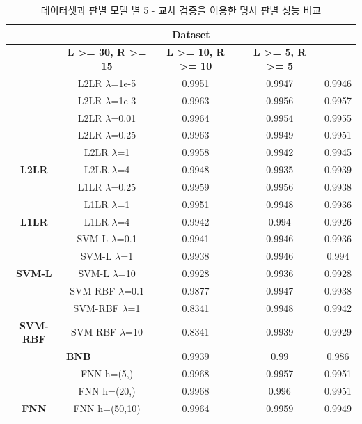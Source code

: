 \documentclass[11pt]{article}
\begin{document}
\begin{table}[ht]
\small
\centering
\caption{데이터셋과 판별 모델 별 5 - 교차 검증을 이용한 명사 판별 성능 비교}
\label{tab:classifier_comparison}
\begin{tabular}{|c|c|c|c|c|}
\hline
\rowcolor[HTML]{EFEFEF} 
\multicolumn{2}{|c|}{\cellcolor[HTML]{EFEFEF}\textbf{}} & \multicolumn{3}{c|}{\cellcolor[HTML]{EFEFEF}\textbf{Dataset}} \\ \hline
\rowcolor[HTML]{EFEFEF} 
\multicolumn{2}{|c|}{\cellcolor[HTML]{EFEFEF}\textbf{Algorithm}} & \textbf{L \textgreater= 30, R \textgreater= 15} & \textbf{L \textgreater= 10, R \textgreater= 10} & \textbf{L \textgreater= 5, R \textgreater= 5} \\ \hline
 & L2LR $\lambda$=1e-5 & 0.9951 & 0.9947 & 0.9946 \\ \cline{2-5} 
 & L2LR $\lambda$=1e-3 & 0.9963 & 0.9956 & 0.9957 \\ \cline{2-5} 
 & L2LR $\lambda$=0.01 & 0.9964 & 0.9954 & 0.9955 \\ \cline{2-5} 
 & L2LR $\lambda$=0.25 & 0.9963 & 0.9949 & 0.9951 \\ \cline{2-5} 
 & L2LR $\lambda$=1 & 0.9958 & 0.9942 & 0.9945 \\ \cline{2-5} 
\multirow{-6}{*}{\textbf{L2LR}} & L2LR $\lambda$=4 & 0.9948 & 0.9935 & 0.9939 \\ \hline
 & L1LR $\lambda$=0.25 & 0.9959 & 0.9956 & 0.9938 \\ \cline{2-5} 
 & L1LR $\lambda$=1 & 0.9951 & 0.9948 & 0.9936 \\ \cline{2-5} 
\multirow{-3}{*}{\textbf{L1LR}} & L1LR $\lambda$=4 & 0.9942 & 0.994 & 0.9926 \\ \hline
 & SVM-L $\lambda$=0.1 & 0.9941 & 0.9946 & 0.9936 \\ \cline{2-5} 
 & SVM-L $\lambda$=1 & 0.9938 & 0.9946 & 0.994 \\ \cline{2-5} 
\multirow{-3}{*}{\textbf{SVM-L}} & SVM-L $\lambda$=10 & 0.9928 & 0.9936 & 0.9928 \\ \hline
 & SVM-RBF $\lambda$=0.1 & 0.9877 & 0.9947 & 0.9938 \\ \cline{2-5} 
 & SVM-RBF $\lambda$=1 & 0.8341 & 0.9948 & 0.9942 \\ \cline{2-5} 
\multirow{-3}{*}{\textbf{SVM-RBF}} & SVM-RBF $\lambda$=10 & 0.8341 & 0.9939 & 0.9929 \\ \hline
\multicolumn{2}{|c|}{\textbf{BNB}} & 0.9939 & 0.99 & 0.986 \\ \hline
 & FNN h=(5,) & 0.9968 & 0.9957 & 0.9951 \\ \cline{2-5} 
 & FNN h=(20,) & 0.9968 & 0.996 & 0.9951 \\ \cline{2-5} 
\multirow{-3}{*}{\textbf{FNN}} & FNN h=(50,10) & 0.9964 & 0.9959 & 0.9949 \\ \hline
\end{tabular}%
\end{table}
\end{document}
